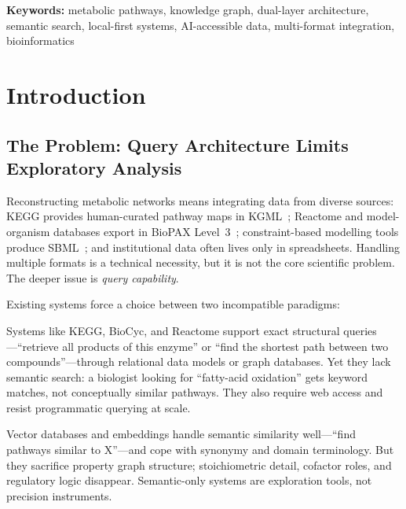 \documentclass[10pt]{article}
\begin{document}
\textbf{Keywords:} metabolic pathways, knowledge graph, dual-layer architecture,
semantic search, local-first systems, AI-accessible data, multi-format integration,
bioinformatics

\section{Introduction}

\subsection{The Problem: Query Architecture Limits Exploratory Analysis}

Reconstructing metabolic networks means integrating data from diverse sources:
KEGG provides human-curated pathway maps in KGML~\citep{kanehisa2021kegg};
Reactome and model-organism databases export in
BioPAX Level~3~\citep{demir2010biopax}; constraint-based modelling tools
produce SBML~\citep{keating2020sbml}; and institutional data often lives only
in spreadsheets. Handling multiple formats is a technical necessity, but it is
not the core scientific problem. The deeper issue is \emph{query capability}.

Existing systems force a choice between two incompatible paradigms:

\begin{description}[leftmargin=*,itemsep=2pt]
  \item[Structural precision.] Systems like KEGG, BioCyc, and Reactome support
    exact structural queries---``retrieve all products of this enzyme'' or
    ``find the shortest path between two compounds''---through relational data
    models or graph databases. Yet they lack semantic search: a biologist
    looking for ``fatty-acid oxidation'' gets keyword matches, not conceptually
    similar pathways. They also require web access and resist programmatic
    querying at scale.

  \item[Semantic expressivity.] Vector databases and embeddings handle
    semantic similarity well---``find pathways similar to X''---and cope with
    synonymy and domain terminology. But they sacrifice property graph
    structure; stoichiometric detail, cofactor roles, and regulatory logic
    disappear. Semantic-only systems are exploration tools, not precision
    instruments.
\end{description}
\end{document}
